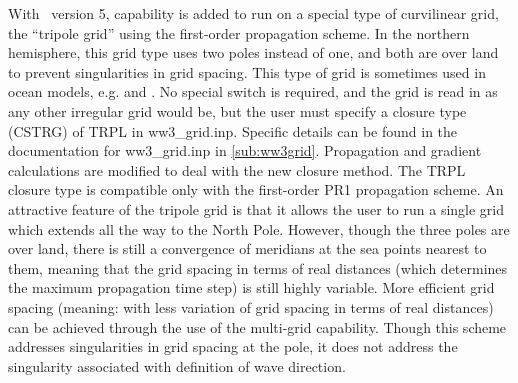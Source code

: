 With \ws\ version 5, capability is added to run on a special type of curvilinear grid, the ``tripole grid'' using the first-order propagation scheme. In the northern hemisphere, this grid type uses two poles instead of one, and both are over land to prevent singularities in grid spacing. This type of grid is sometimes used in ocean models, e.g. \citep{art:Murr96} and \citep{art:Metz14}. No special switch is required, and the grid is read in as any other irregular grid would be, but the user must specify a closure type ({\code CSTRG}) of {\code TRPL} in {\file ww3\_grid.inp}. Specific details can be found in the documentation for {\file ww3\_grid.inp} in \para\ref{sub:ww3grid}. Propagation and gradient calculations are modified to deal with the new closure method. The {\code TRPL} closure type is compatible only with the first-order {\code PR1} propagation scheme. An attractive feature of the tripole grid is that it allows the user to run a single grid which extends all the way to the North Pole.  However, though the three poles are over land, there is still a convergence of meridians at the sea points nearest to them, meaning that the grid spacing in terms of real distances (which determines the maximum propagation time step) is still highly variable. More efficient grid spacing (meaning: with less variation of grid spacing in terms of real distances) can be achieved through the use of the multi-grid capability. Though this scheme addresses singularities in grid spacing at the pole, it does not address the singularity associated with definition of wave direction.
